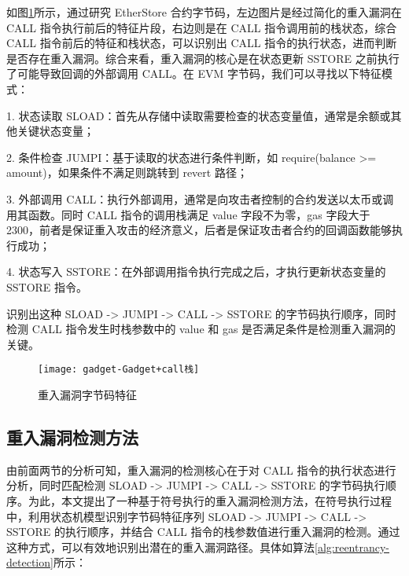 \documentclass[print, master, vlined, timesmath]{DissertUESTC}
\begin{document}
如图\ref{fig:重入gadget}所示，通过研究 EtherStore 合约字节码，左边图片是经过简化的重入漏洞在 CALL 指令执行前后的特征片段，右边则是在 CALL 指令调用前的栈状态，综合 CALL 指令前后的特征和栈状态，可以识别出 CALL 指令的执行状态，进而判断是否存在重入漏洞。综合来看，重入漏洞的核心是在状态更新 SSTORE 之前执行了可能导致回调的外部调用 CALL。在 EVM 字节码，我们可以寻找以下特征模式：

1. 状态读取 SLOAD：首先从存储中读取需要检查的状态变量值，通常是余额或其他关键状态变量；

2. 条件检查 JUMPI：基于读取的状态进行条件判断，如 require(balance >= amount)，如果条件不满足则跳转到 revert 路径；

3. 外部调用 CALL：执行外部调用，通常是向攻击者控制的合约发送以太币或调用其函数。同时 CALL 指令的调用栈满足 value 字段不为零，gas 字段大于 2300，前者是保证重入攻击的经济意义，后者是保证攻击者合约的回调函数能够执行成功；

4. 状态写入 SSTORE：在外部调用指令执行完成之后，才执行更新状态变量的 SSTORE 指令。

识别出这种 SLOAD ->  JUMPI -> CALL -> SSTORE 的字节码执行顺序，同时检测 CALL 指令发生时栈参数中的 value 和 gas 是否满足条件是检测重入漏洞的关键。


\begin{figure}[h]
    \centering
    \texttt{[image: gadget-Gadget+call栈]}
    \caption{重入漏洞字节码特征}
    \label{fig:重入gadget}
\end{figure}


\subsection{重入漏洞检测方法}


由前面两节的分析可知，重入漏洞的检测核心在于对 CALL 指令的执行状态进行分析，同时匹配检测 SLOAD ->  JUMPI -> CALL -> SSTORE 的字节码执行顺序。为此，本文提出了一种基于符号执行的重入漏洞检测方法，在符号执行过程中，利用状态机模型识别字节码特征序列 SLOAD ->  JUMPI -> CALL -> SSTORE 的执行顺序，并结合 CALL 指令的栈参数值进行重入漏洞的检测。通过这种方式，可以有效地识别出潜在的重入漏洞路径。具体如算法\ref{alg:reentrancy-detection}所示：
\end{document}
